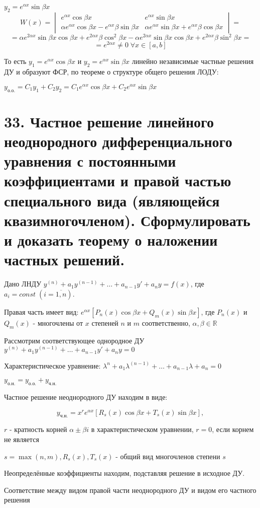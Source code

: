 \documentclass[11pt]{article}
\begin{document}
\par $y_{2} = e^{\alpha x}\sin \beta x$
$$W(x) = \begin{vmatrix}
e^{\alpha x} \cos \beta x & e^{\alpha x} \sin \beta x \\
\alpha e^{\alpha x} \cos \beta x - e^{\alpha x} \beta \sin \beta x & \alpha e^{\alpha x} \sin \beta x + e^{\alpha x} \beta \cos \beta x
\end{vmatrix} =$$ 
$$= \alpha e^{2\alpha x} \sin \beta x \cos \beta x + e^{2\alpha x} \beta \cos^2 \beta x - \alpha e^{2\alpha x} \sin \beta x \cos \beta x + e^{2\alpha x} \beta \sin^2 \beta x =$$
$$= e^{2\alpha x}\neq 0 \; \forall x \in [a, b]$$
\par То есть $y_{1} = e^{\alpha x} \cos \beta x$ и $y_{2} = e^{\alpha x} \sin \beta x$ линейно независимые частные решения ДУ и образуют ФСР, по теореме о структуре общего решения ЛОДУ:
\par $y_{\text{о.о.}} = C_{1}y_{1} + C_{2}y_{2} = C_{1}e^{\alpha x} \cos \beta x + C_{2}e^{\alpha x} \sin \beta x$


\section*{33. Частное решение линейного неоднородного дифференциального уравнения с постоянными коэффициентами и правой частью специального вида (являющейся квазимногочленом). Сформулировать и доказать теорему о наложении частных решений.}
\par Дано ЛНДУ $y^{(n)} + a_{1}y^{(n-1)} + \dots + a_{n-1}y' + a_{n}y = f(x)$, где $a_{i} = const \; (i = \overline{1, n})$.
\par Правая часть имеет вид: $e^{\alpha x} [P_{n}(x)\cos\beta x + Q_{m}(x)\sin\beta x]$, где $P_{n}(x)$ и $Q_{m}(x)$ - многочлены от $x$ степеней $n$ и $m$ соответственно, $\alpha, \beta \in \mathbb{R}$
\par Рассмотрим соответствующее однородное ДУ $y^{(n)} + a_{1}y^{(n-1)} + \dots + a_{n-1}y' + a_{n}y = 0$
\par Характеристическое уравнение: $\lambda^{n} + a_{1}\lambda^{(n-1)} + \dots + a_{n-1}\lambda + a_{n} = 0$
\par $y_{\text{о.н.}} = y_{\text{о.о.}} +y_{\text{ч.н.}}$
\par Частное решение неоднородного ДУ находим в виде:
\par $$y_{\text{ч.н.}} = x^{r}e^{\alpha x}[R_{s}(x)\cos\beta x + T_{s}(x)\sin\beta x],$$
\par $r$ - кратность корней $\alpha \pm \beta i$ в характеристическом уравнении, $r = 0$, если корнем не является
\par $s = \max(n, m), R_{s}(x), T_{s}(x)$ - общий вид многочленов степени $s$
\par Неопределённые коэффициенты находим, подставляя решение в исходное ДУ.
\par Соответствие между видом правой части неоднородного ДУ и видом его частного решения
\end{document}
